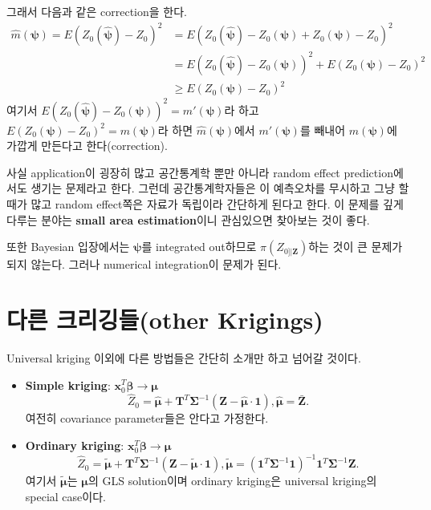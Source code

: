 \documentclass[b5paper,]{scrbook}
\theoremstyle{plain}
\theoremstyle{definition}
\numberwithin{equation}{section}
\begin{document}
그래서 다음과 같은 correction을 한다. \[
\begin{aligned}
\hat{m}(\boldsymbol{\psi})=E(Z_{0}(\hat{\boldsymbol{\psi}})-Z_{0})^{2}&=E(Z_{0}(\hat{\boldsymbol{\psi}})-Z_{0}(\boldsymbol{\psi})+Z_{0}(\boldsymbol{\psi})-Z_{0})^2\\
&=E(Z_{0}(\hat{\boldsymbol{\psi}})-Z_{0}(\boldsymbol{\psi}))^{2}+E(Z_{0}(\boldsymbol{\psi})-Z_{0})^2\\
&\geq E(Z_{0}(\boldsymbol{\psi})-Z_{0})^2
\end{aligned}
\] 여기서
\(E(Z_{0}(\hat{\boldsymbol{\psi}})-Z_{0}(\boldsymbol{\psi}))^{2}=m'(\boldsymbol{\psi})\)라
하고 \(E(Z_{0}(\boldsymbol{\psi})-Z_{0})^2=m(\boldsymbol{\psi})\)라 하면
\(\hat{m}(\boldsymbol{\psi})\)에서 \(m'(\boldsymbol{\psi})\)를 빼내어
\(m(\boldsymbol{\psi})\)에 가깝게 만든다고 한다(correction).

사실 application이 굉장히 많고 공간통계학 뿐만 아니라 random effect
prediction에서도 생기는 문제라고 한다. 그런데 공간통계학자들은 이
예측오차를 무시하고 그냥 할 때가 많고 random effect쪽은 자료가 독립이라
간단하게 된다고 한다. 이 문제를 깊게 다루는 분야는 \textbf{small area
estimation}이니 관심있으면 찾아보는 것이 좋다.

또한 Bayesian 입장에서는 \(\boldsymbol{\psi}\)를 integrated out하므로
\(\pi(Z_{0]|\mathbf{Z}})\)하는 것이 큰 문제가 되지 않는다. 그러나
numerical integration이 문제가 된다.

\section{다른 크리깅들(other Krigings)}\label{-other-krigings}

Universal kriging 이외에 다른 방법들은 간단히 소개만 하고 넘어갈 것이다.

\begin{itemize}
\item
  \textbf{Simple kriging}:
  \(\mathbf{x}_{0}^{T}\boldsymbol{\beta} \rightarrow \boldsymbol{\mu}\)
  \[\hat{Z}_{0}=\hat{\boldsymbol{\mu}}+\mathbf{T}^{T}\boldsymbol{\Sigma}^{-1}(\mathbf{Z}-\hat{\boldsymbol{\mu}}\cdot \mathbf{1}), \hat{\mathbf{\mu}}=\bar{\mathbf{Z}}.\]
  여전히 covariance parameter들은 안다고 가정한다.
\item
  \textbf{Ordinary kriging}:
  \(\mathbf{x}_{0}^{T}\boldsymbol{\beta} \rightarrow \boldsymbol{\mu}\)
  \[\hat{Z}_{0}=\tilde{\boldsymbol{\mu}}+\mathbf{T}^{T}\boldsymbol{\Sigma}^{-1}(\mathbf{Z}-\tilde{\boldsymbol{\mu}}\cdot \mathbf{1}), \tilde{\boldsymbol{\mu}}=(\mathbf{1}^{T}\boldsymbol{\Sigma}^{-1}\mathbf{1})^{-1}\mathbf{1}^{T}\boldsymbol{\Sigma}^{-1}\mathbf{Z}.\]
  여기서 \(\tilde{\boldsymbol{\mu}}\)는 \(\boldsymbol{\mu}\)의 GLS
  solution이며 ordinary kriging은 universal kriging의 special case이다.
\end{itemize}
\end{document}
